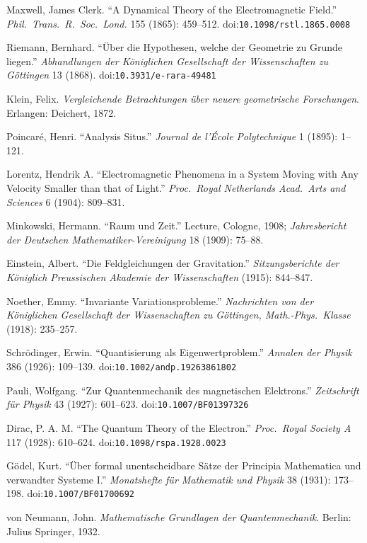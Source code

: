 \documentclass[11pt,a4paper]{article}
\theoremstyle{plain}
\theoremstyle{definition}
\theoremstyle{remark}
\begin{document}
{\begin{description}[leftmargin=1.1cm,labelwidth=1.0cm,labelsep=0.1cm,itemsep=1pt,font=\normalfont\bfseries]
\item[H15] Maxwell, James Clerk. ``A Dynamical Theory of the Electromagnetic Field.'' \emph{Phil.\ Trans.\ R.\ Soc.\ Lond.} 155 (1865): 459--512. doi:\nolinkurl{10.1098/rstl.1865.0008}
\item[H16] Riemann, Bernhard. ``\"Uber die Hypothesen, welche der Geometrie zu Grunde liegen.'' \emph{Abhandlungen der K\"oniglichen Gesellschaft der Wissenschaften zu G\"ottingen} 13 (1868). doi:\nolinkurl{10.3931/e-rara-49481}
\item[H17] Klein, Felix. \emph{Vergleichende Betrachtungen \"uber neuere geometrische Forschungen}. Erlangen: Deichert, 1872.
\item[H18] Poincar\'e, Henri. ``Analysis Situs.'' \emph{Journal de l'\'Ecole Polytechnique} 1 (1895): 1--121.
\item[H19] Lorentz, Hendrik A. ``Electromagnetic Phenomena in a System Moving with Any Velocity Smaller than that of Light.'' \emph{Proc.\ Royal Netherlands Acad.\ Arts and Sciences} 6 (1904): 809--831.
\item[H20] Minkowski, Hermann. ``Raum und Zeit.'' Lecture, Cologne, 1908; \emph{Jahresbericht der Deutschen Mathematiker-Vereinigung} 18 (1909): 75--88.
\item[H21] Einstein, Albert. ``Die Feldgleichungen der Gravitation.'' \emph{Sitzungsberichte der K\"oniglich Preussischen Akademie der Wissenschaften} (1915): 844--847.
\item[H22] Noether, Emmy. ``Invariante Variationsprobleme.'' \emph{Nachrichten von der K\"oniglichen Gesellschaft der Wissenschaften zu G\"ottingen, Math.-Phys.\ Klasse} (1918): 235--257.
\item[H23] Schr\"odinger, Erwin. ``Quantisierung als Eigenwertproblem.'' \emph{Annalen der Physik} 386 (1926): 109--139. doi:\nolinkurl{10.1002/andp.19263861802}
\item[H24] Pauli, Wolfgang. ``Zur Quantenmechanik des magnetischen Elektrons.'' \emph{Zeitschrift f\"ur Physik} 43 (1927): 601--623. doi:\nolinkurl{10.1007/BF01397326}
\item[H25] Dirac, P. A. M. ``The Quantum Theory of the Electron.'' \emph{Proc.\ Royal Society A} 117 (1928): 610--624. doi:\nolinkurl{10.1098/rspa.1928.0023}
\item[H26] G\"odel, Kurt. ``\"Uber formal unentscheidbare S\"atze der Principia Mathematica und verwandter Systeme I.'' \emph{Monatshefte f\"ur Mathematik und Physik} 38 (1931): 173--198. doi:\nolinkurl{10.1007/BF01700692}
\item[H27] von Neumann, John. \emph{Mathematische Grundlagen der Quantenmechanik}. Berlin: Julius Springer, 1932.

\end{description}}
\end{document}
